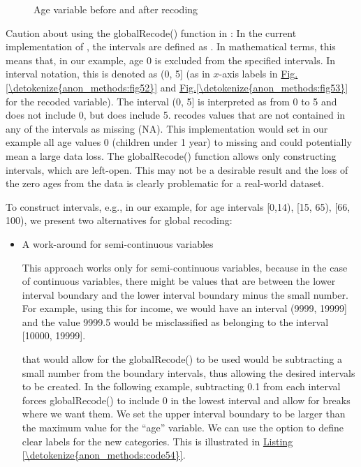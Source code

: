 \documentclass[letterpaper,10pt,english]{sphinxmanual}
\begin{document}
\begin{figure}[htbp]
\centering
\capstart

\noindent{}
\caption{Age variable before and after recoding}\label{\detokenize{anon_methods:fig53}}\label{\detokenize{anon_methods:id30}}\end{figure}

Caution about using the globalRecode() function in : In the
current implementation of , the intervals are defined as
. In mathematical terms, this means that, in our example,
age 0 is excluded from the specified intervals. In interval notation,
this is denoted as (0, 5{]} (as in \(x\)-axis labels in \hyperref[\detokenize{anon_methods:fig52}]{Fig.\@ \ref{\detokenize{anon_methods:fig52}}} and
\hyperref[\detokenize{anon_methods:fig53}]{Fig.\@ \ref{\detokenize{anon_methods:fig53}}} for the recoded variable). The interval (0, 5{]} is
interpreted as from 0 to 5 and does not include 0, but does include 5.
 recodes values that are not contained in any of the intervals as
missing (NA). This implementation would set in our example all age
values 0 (children under 1 year) to missing and could potentially mean a
large data loss. The globalRecode() function allows only constructing
intervals, which are left-open. This may not be a desirable result and
the loss of the zero ages from the data is clearly problematic for a
real-world dataset.

To construct  intervals, e.g., in our example, for age
intervals {[}0,14), {[}15, 65), {[}66, 100), we present two alternatives for
global recoding:
\begin{itemize}
\item {} 
A work-around for semi-continuous variables %
\begin{footnote}[3]\sphinxAtStartFootnote
This approach works only for semi-continuous variables, because in
the case of continuous variables, there might be values that are
between the lower interval boundary and the lower interval boundary
minus the small number. For example, using this for income, we would
have an interval (9999, 19999{]} and the value 9999.5 would be
misclassified as belonging to the interval {[}10000, 19999{]}.
%
\end{footnote}
that would allow for the globalRecode() to be used would be
subtracting a small number from the boundary intervals, thus allowing
the desired intervals to be created. In the following example,
subtracting 0.1 from each interval forces globalRecode() to include 0
in the lowest interval and allow for breaks where we want them. We
set the upper interval boundary to be larger than the maximum value
for the “age” variable. We can use the option  to define
clear labels for the new categories. This is illustrated in \hyperref[\detokenize{anon_methods:code54}]{Listing \ref{\detokenize{anon_methods:code54}}}.

\end{itemize}
\end{document}
